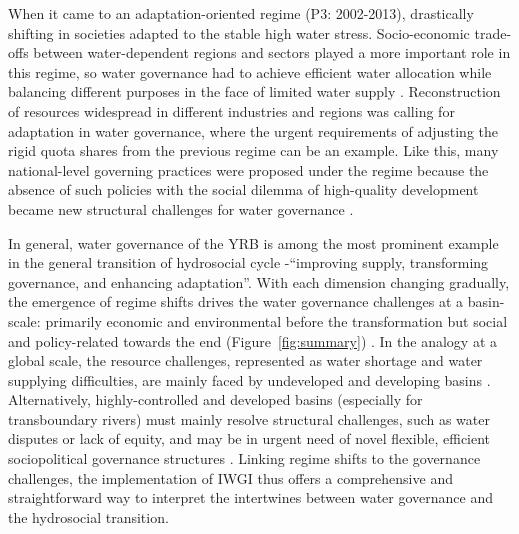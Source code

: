 When it came to an adaptation-oriented regime (P3: 2002-2013), drastically shifting in societies adapted to the stable high water stress.
Socio-economic trade-offs between water-dependent regions and sectors played a more important role in this regime, so water governance had to achieve efficient water allocation while balancing different purposes in the face of limited water supply
\cite{dalinBalancingwaterresource2015}.
Reconstruction of resources widespread in different industries and regions was calling for adaptation in water governance, where the urgent requirements of adjusting the rigid quota shares from the previous regime can be an example.
Like this, many national-level governing practices were proposed under the regime because the absence of such policies with the social dilemma of high-quality development became new structural challenges for water governance
\cite{konarExpandingScopeFoundation2019}.

In general, water governance of the YRB is among the most prominent example in the general transition of hydrosocial cycle -``improving supply, transforming governance, and enhancing adaptation''.
With each dimension changing gradually, the emergence of regime shifts drives the water governance challenges at a basin-scale: primarily economic and environmental before the transformation but social and policy-related towards the end (Figure~\ref{fig:summary}) \cite{singhWaterGovernanceChallenges2019,porcherFacingChallengesWater2019}.
In the analogy at a global scale, the resource challenges, represented as water shortage and water supplying difficulties, are mainly faced by undeveloped and developing basins
\cite{allanNavigatingcomplexitiescoordinated2019,florkeWatercompetitioncities2018,liuWaterSustainabilityChina2012}.
Alternatively, highly-controlled and developed basins (especially for transboundary rivers) must mainly resolve structural challenges, such as water disputes or lack of equity, and may be in urgent need of novel flexible, efficient sociopolitical governance structures %
\cite{kitroeffThisWarCrossBorder2020,kitroeffThisWarCrossBorder2020,roobavannanRoleSectoralTransformation2017,unep-dhiTransboundaryRiverBasins2016}.
Linking regime shifts to the governance challenges, the implementation of IWGI thus offers a comprehensive and straightforward way to interpret the intertwines between water governance and the hydrosocial transition.


